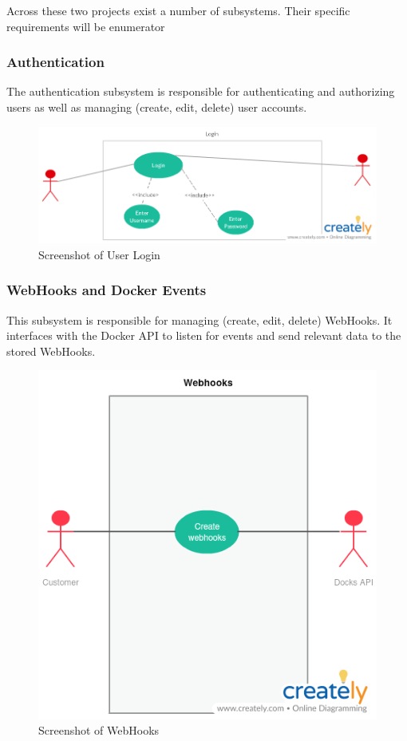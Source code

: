 \documentclass[]{article}
\begin{document}
Across these two projects exist a number of subsystems.
Their specific requirements will be enumerator

\subsubsection{Authentication}
The authentication subsystem is responsible for authenticating
and authorizing users as well as managing (create, edit, delete) user accounts.

\begin{figure}[H]
	\centering
	\includegraphics[scale=0.5]{uml/login.png}
	\caption{Screenshot of User Login}
\end{figure}

\subsubsection{WebHooks and Docker Events}
This subsystem is responsible for managing (create, edit, delete) WebHooks.
It interfaces with the Docker API to listen for events and send relevant
data to the stored WebHooks.

\begin{figure}[H]
	\centering
	\includegraphics[scale=0.5]{uml/webhooks.png}
	\caption{Screenshot of WebHooks}
\end{figure}
\end{document}

